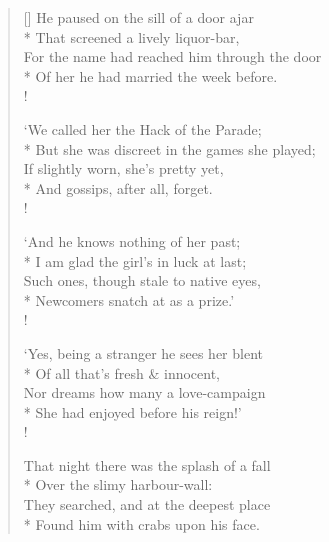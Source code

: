 \documentclass[MAIN]{subfiles}
\begin{document}
\settowidth{\versewidth}{For the name had reached him through the door}
\begin{verse}[\versewidth]
He paused on the sill of a door ajar\\*
That screened a lively liquor-bar,\\
For the name had reached him through the door\\*
Of her he had married the week before.\\!

`We called her the Hack of the Parade;\\*
But she was discreet in the games she played;\\
If slightly worn, she's pretty yet,\\*
And gossips, after all, forget.\\!

`And he knows nothing of her past;\\*
I am glad the girl's in luck at last;\\
Such ones, though stale to native eyes,\\*
Newcomers snatch at as a prize.'\\!

`Yes, being a stranger he sees her blent\\*
Of all that's fresh \& innocent,\\
Nor dreams how many a love-campaign\\*
She had enjoyed before his reign!'\\!

That night there was the splash of a fall\\*
Over the slimy harbour-wall:\\
They searched, and at the deepest place\\*
Found him with crabs upon his face.
\end{verse}
\end{document}
